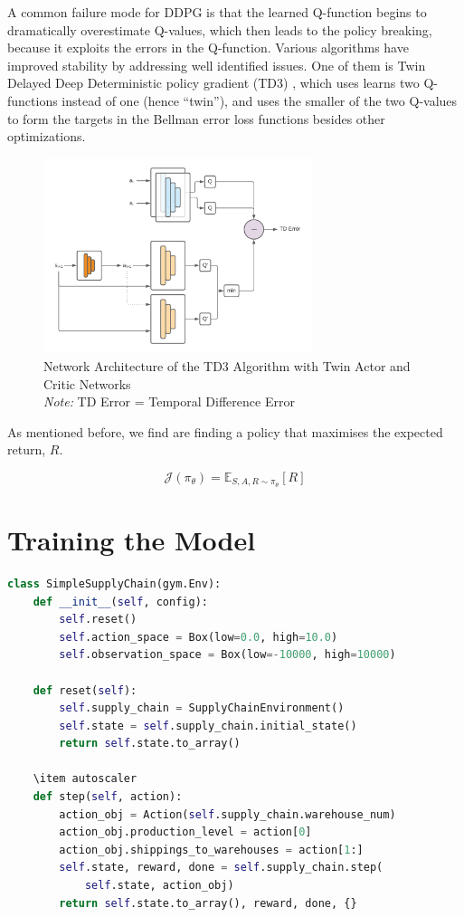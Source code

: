 \documentclass{article}
\begin{document}
A common failure mode for DDPG is that the learned Q-function begins to dramatically overestimate Q-values, which then leads to the policy breaking, because it exploits the errors in the Q-function.  Various algorithms have improved stability by addressing well identified issues. One of them is Twin Delayed Deep Deterministic policy gradient (TD3) \cite{fujimoto_addressing_2018}, which uses learns two Q-functions instead of one (hence “twin”), and uses the smaller of the two Q-values to form the targets in the Bellman error loss functions besides other optimizations.

\begin{figure}[h!]
    \centering
    \includegraphics[width=0.7\textwidth]{TD3.png}
    \caption{Network Architecture of the TD3 Algorithm with Twin Actor and Critic Networks \\ \emph{Note:} TD Error = Temporal Difference Error}
\end{figure}

As mentioned before, we find are finding a policy that maximises the expected return, \(R\).

\begin{equation}
    \mathcal{J}(\pi_{\theta}) = \mathbb{E}_{S, A, R \sim \pi_{\theta}} \left[ R \right] \end{equation}

\pagebreak

\section{Training the Model}

\begin{lstlisting}[language=Python]
class SimpleSupplyChain(gym.Env):
    def __init__(self, config):
        self.reset()
        self.action_space = Box(low=0.0, high=10.0)
        self.observation_space = Box(low=-10000, high=10000)

    def reset(self):
        self.supply_chain = SupplyChainEnvironment()
        self.state = self.supply_chain.initial_state()
        return self.state.to_array()

    \item autoscaler
    def step(self, action):
        action_obj = Action(self.supply_chain.warehouse_num)
        action_obj.production_level = action[0]
        action_obj.shippings_to_warehouses = action[1:]
        self.state, reward, done = self.supply_chain.step(
            self.state, action_obj)
        return self.state.to_array(), reward, done, {}
\end{lstlisting}
\end{document}
